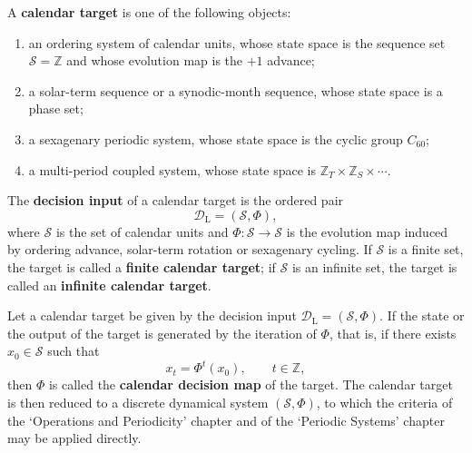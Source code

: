 \begin{definition}\label{def:calendar_target}
A \textbf{calendar target} is one of the following objects:
\begin{enumerate}[label=(\roman*)]
    \item an ordering system of calendar units, whose state space is the sequence set \(\mathcal S=\mathbb Z\) and whose evolution map is the \(+1\) advance;
    \item a solar-term sequence or a synodic-month sequence, whose state space is a phase set;
    \item a sexagenary periodic system, whose state space is the cyclic group \(C_{60}\);
    \item a multi-period coupled system, whose state space is \(\mathbb Z_T\times\mathbb Z_S\times\cdots\).
\end{enumerate}
The \textbf{decision input} of a calendar target is the ordered pair
\[
\mathcal D_{\mathrm{L}}=(\mathcal S,\Phi),
\]
where \(\mathcal S\) is the set of calendar units and \(\Phi:\mathcal S\to\mathcal S\) is the evolution map induced by ordering advance, solar-term rotation or sexagenary cycling. If \(\mathcal S\) is a finite set, the target is called a \textbf{finite calendar target}; if \(\mathcal S\) is an infinite set, the target is called an \textbf{infinite calendar target}.
\end{definition}

\begin{definition}\label{def:calendar_periodization}
Let a calendar target be given by the decision input \(\mathcal D_{\mathrm{L}}=(\mathcal S,\Phi)\). If the state or the output of the target is generated by the iteration of \(\Phi\), that is, if there exists \(x_0\in\mathcal S\) such that
\[
x_t=\Phi^t(x_0),\qquad t\in\mathbb Z,
\]
then \(\Phi\) is called the \textbf{calendar decision map} of the target. The calendar target is then reduced to a discrete dynamical system \((\mathcal S,\Phi)\), to which the criteria of the `Operations and Periodicity' chapter and of the `Periodic Systems' chapter may be applied directly.
\end{definition}


